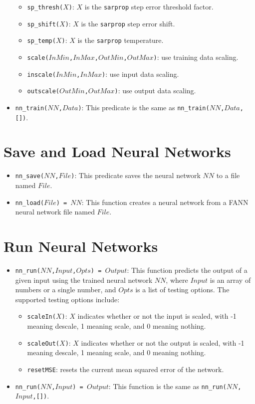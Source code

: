 \begin{itemize}
\begin{itemize}
\item \texttt{sp\_thresh($X$)}: $X$ is the \texttt{sarprop} step error threshold factor.
\item \texttt{sp\_shift($X$)}: $X$ is the \texttt{sarprop} step error shift.
\item \texttt{sp\_temp($X$)}: $X$ is the \texttt{sarprop} temperature.
\item \texttt{scale($InMin$,$InMax$,$OutMin$,$OutMax$)}: use training data scaling.
\item \texttt{inscale($InMin$,$InMax$)}:  use input data scaling.
\item \texttt{outscale($OutMin$,$OutMax$)}: use output data scaling.
\end{itemize}

\item \texttt{nn\_train($NN$,$Data$)}: This predicate is the same as \texttt{nn\_train($NN$,$Data$,[])}.
\end{itemize}

\section{Save and Load Neural Networks}
\begin{itemize}
\item \texttt{nn\_save($NN$,$File$)}: This predicate saves the neural network $NN$ to a file named $File$.

\item \texttt{nn\_load($File$) = $NN$}: This function creates a neural network from a FANN neural network file named $File$.
\end{itemize}

\section{Run Neural Networks}
\begin{itemize}
\item \texttt{nn\_run($NN$,$Input$,$Opts$) = $Output$}: This function predicts the output of a given input using the trained neural network $NN$, where $Input$ is an array of numbers or a single number, and $Opts$ is a list of testing options. The supported testing options include:
\begin{itemize}
\item \texttt{scaleIn($X$)}: $X$ indicates whether or not the input is scaled, with -1 meaning descale, 1 meaning scale, and 0 meaning nothing.
\item \texttt{scaleOut($X$)}: $X$ indicates whether or not the output is scaled,  with -1 meaning descale, 1 meaning scale, and 0 meaning nothing.	
\item \texttt{resetMSE}: resets the current mean squared error of the network.
\end{itemize}

\item \texttt{nn\_run($NN$,$Input$) = $Output$}: This function is the same as \texttt{nn\_run($NN$,$Input$,[])}.
\end{itemize}

\ignore{

}
